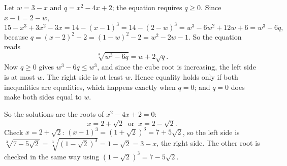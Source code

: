 Let $w=3-x$ and $q=x^2-4x+2$; the equation requires $q\ge0$. Since $x-1=2-w$,
\[
15-x^3+3x^2-3x=14-(x-1)^3=14-(2-w)^3=w^3-6w^2+12w+6=w^3-6q ,
\]
because $q=(x-2)^2-2=(1-w)^2-2=w^2-2w-1$. So the equation reads
\[
\sqrt[3]{w^3-6q}=w+2\sqrt q .
\]
Now $q\ge0$ gives $w^3-6q\le w^3$, and since the cube root is increasing, the left side is at most $w$. The right side is at least $w$. Hence equality holds only if both inequalities are equalities, which happens exactly when $q=0$; and $q=0$ does make both sides equal to $w$.

So the solutions are the roots of $x^2-4x+2=0$:
\[
\boxed{x=2+\sqrt2\ \text{ or }\ x=2-\sqrt2}.
\]
Check $x=2+\sqrt2$: $(x-1)^3=(1+\sqrt2)^3=7+5\sqrt2$, so the left side is $\sqrt[3]{7-5\sqrt2}=\sqrt[3]{(1-\sqrt2)^3}=1-\sqrt2=3-x$, the right side. The other root is checked in the same way using $(1-\sqrt2)^3=7-5\sqrt2$.
